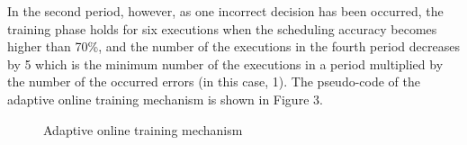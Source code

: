 \documentclass[10pt, conference, compsocconf]{IEEEtran}
\begin{document}
%
In the second period, however, as one incorrect decision has been
occurred, the training phase holds for six executions when the
scheduling accuracy becomes higher than 70\%, and the number of the
executions in the fourth period decreases by 5 which is the minimum
number of the executions in a period multiplied by the number of the
occurred errors (in this case, 1). 
%
The pseudo-code of the adaptive online training mechanism is shown in
Figure 3.
%
\begin{figure}
\begin{algorithmic}[1]
	\ELSE
		\ELSE
		\ENDIF
	\ENDIF
\ENDWHILE
\STATE
{}
\ELSE
\ENDIF
\end{algorithmic}
\caption{Adaptive online training mechanism}
\end{figure}
%
\end{document}

